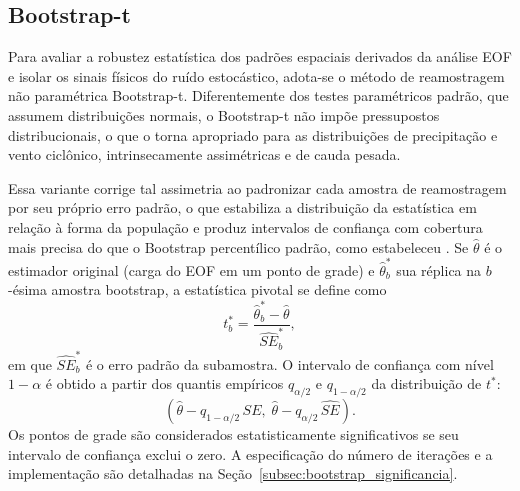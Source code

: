 \subsection{Bootstrap-t}\label{subsec:tb_bootstrap}

Para avaliar a robustez estatística dos padrões espaciais derivados da análise EOF e isolar os sinais físicos do ruído estocástico, adota-se o método de reamostragem não paramétrica Bootstrap-t.
Diferentemente dos testes paramétricos padrão, que assumem distribuições normais, o Bootstrap-t não impõe pressupostos distribucionais, o que o torna apropriado para as distribuições de precipitação e vento ciclônico, intrinsecamente assimétricas e de cauda pesada.

Essa variante corrige tal assimetria ao padronizar cada amostra de reamostragem por seu próprio erro padrão, o que estabiliza a distribuição da estatística em relação à forma da população e produz intervalos de confiança com cobertura mais precisa do que o Bootstrap percentílico padrão, como estabeleceu \citet{hesterberg2015bootstrap}.
Se $\hat{\theta}$ é o estimador original (carga do EOF em um ponto de grade) e $\hat{\theta}^*_b$ sua réplica na $b$-ésima amostra bootstrap, a estatística pivotal se define como
\begin{equation}\label{eq:bootstrap_t}
t^*_b = \frac{\hat{\theta}^*_b - \hat{\theta}}{\widehat{SE}^*_b},
\end{equation}
em que $\widehat{SE}^*_b$ é o erro padrão da subamostra. O intervalo de confiança com nível $1-\alpha$ é obtido a partir dos quantis empíricos $q_{\alpha/2}$ e $q_{1-\alpha/2}$ da distribuição de $t^*$:
\begin{equation}\label{eq:bootstrap_ci}
\left(\hat{\theta} - q_{1-\alpha/2}\,\widehat{SE},\; \hat{\theta} - q_{\alpha/2}\,\widehat{SE}\right).
\end{equation}
Os pontos de grade são considerados estatisticamente significativos se seu intervalo de confiança exclui o zero. A especificação do número de iterações e a implementação são detalhadas na Seção~\ref{subsec:bootstrap_significancia}.
